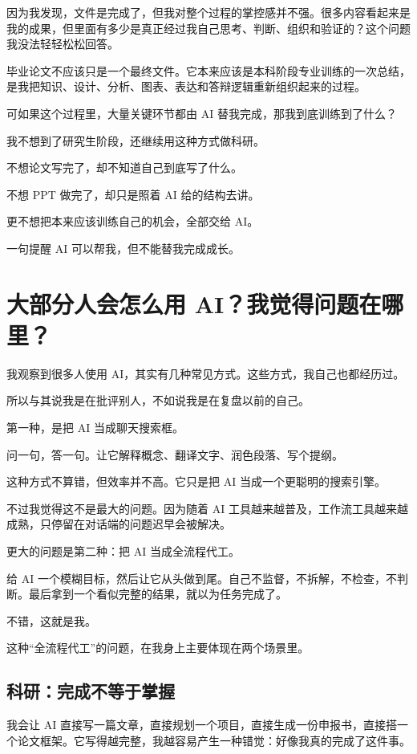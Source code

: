 \documentclass[UTF8,zihao=-4,a4paper]{ctexart}
\begin{document}
因为我发现，文件是完成了，但我对整个过程的掌控感并不强。很多内容看起来是我的成果，但里面有多少是真正经过我自己思考、判断、组织和验证的？这个问题我没法轻轻松松回答。

毕业论文不应该只是一个最终文件。它本来应该是本科阶段专业训练的一次总结，是我把知识、设计、分析、图表、表达和答辩逻辑重新组织起来的过程。

可如果这个过程里，大量关键环节都由 AI 替我完成，那我到底训练到了什么？

我不想到了研究生阶段，还继续用这种方式做科研。\par
不想论文写完了，却不知道自己到底写了什么。\par
不想 PPT 做完了，却只是照着 AI 给的结构去讲。\par
更不想把本来应该训练自己的机会，全部交给 AI。

\begin{amberbox}{一句提醒}
AI 可以帮我，但不能替我完成成长。
\end{amberbox}

\section{大部分人会怎么用 AI？我觉得问题在哪里？}
我观察到很多人使用 AI，其实有几种常见方式。这些方式，我自己也都经历过。

所以与其说我是在批评别人，不如说我是在复盘以前的自己。

第一种，是把 AI 当成聊天搜索框。

问一句，答一句。让它解释概念、翻译文字、润色段落、写个提纲。

这种方式不算错，但效率并不高。它只是把 AI 当成一个更聪明的搜索引擎。

不过我觉得这不是最大的问题。因为随着 AI 工具越来越普及，工作流工具越来越成熟，只停留在对话端的问题迟早会被解决。

更大的问题是第二种：把 AI 当成全流程代工。

给 AI 一个模糊目标，然后让它从头做到尾。自己不监督，不拆解，不检查，不判断。最后拿到一个看似完整的结果，就以为任务完成了。

不错，这就是我。

这种“全流程代工”的问题，在我身上主要体现在两个场景里。

\subsection{科研：完成不等于掌握}
我会让 AI 直接写一篇文章，直接规划一个项目，直接生成一份申报书，直接搭一个论文框架。它写得越完整，我越容易产生一种错觉：好像我真的完成了这件事。
\end{document}

